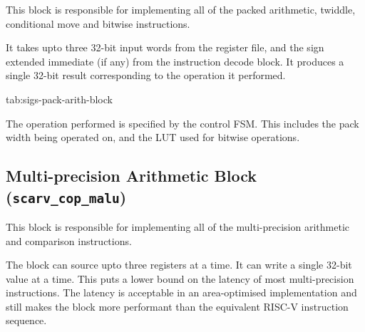 \documentclass{scarv-report}
\begin{document}
This block is responsible for implementing all of the packed arithmetic,
twiddle, conditional move and bitwise instructions.

It takes upto three 32-bit input words from the register file, and the sign
extended immediate (if any) from the instruction decode block.
It produces a single 32-bit result corresponding to the operation it
performed.

{tab:sigs-pack-arith-block}

The operation performed is specified by the control FSM.
This includes the pack width being operated on, and the LUT used for bitwise
operations.

\subsection{Multi-precision Arithmetic Block ({\tt scarv\_cop\_malu})}

This block is responsible for implementing all of the multi-precision
arithmetic and comparison instructions.

The block can source upto three registers at a time.
It can write a single 32-bit value at a time.
This puts a lower bound on the latency of most multi-precision instructions.
The latency is acceptable in an area-optimised implementation and still
makes the block more performant than the equivalent RISC-V instruction
sequence.
\end{document}

